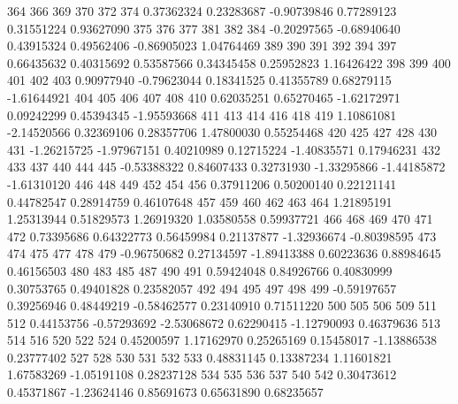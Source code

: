 \documentclass{article}
\begin{document}
\begin{Schunk}
\begin{Soutput}
        364         366         369         370         372         374 
 0.37362324  0.23283687 -0.90739846  0.77289123  0.31551224  0.93627090 
        375         376         377         381         382         384 
-0.20297565 -0.68940640  0.43915324  0.49562406 -0.86905023  1.04764469 
        389         390         391         392         394         397 
 0.66435632  0.40315692  0.53587566  0.34345458  0.25952823  1.16426422 
        398         399         400         401         402         403 
 0.90977940 -0.79623044  0.18341525  0.41355789  0.68279115 -1.61644921 
        404         405         406         407         408         410 
 0.62035251  0.65270465 -1.62172971  0.09242299  0.45394345 -1.95593668 
        411         413         414         416         418         419 
 1.10861081 -2.14520566  0.32369106  0.28357706  1.47800030  0.55254468 
        420         425         427         428         430         431 
-1.26215725 -1.97967151  0.40210989  0.12715224 -1.40835571  0.17946231 
        432         433         437         440         444         445 
-0.53388322  0.84607433  0.32731930 -1.33295866 -1.44185872 -1.61310120 
        446         448         449         452         454         456 
 0.37911206  0.50200140  0.22121141  0.44782547  0.28914759  0.46107648 
        457         459         460         462         463         464 
 1.21895191  1.25313944  0.51829573  1.26919320  1.03580558  0.59937721 
        466         468         469         470         471         472 
 0.73395686  0.64322773  0.56459984  0.21137877 -1.32936674 -0.80398595 
        473         474         475         477         478         479 
-0.96750682  0.27134597 -1.89413388  0.60223636  0.88984645  0.46156503 
        480         483         485         487         490         491 
 0.59424048  0.84926766  0.40830999  0.30753765  0.49401828  0.23582057 
        492         494         495         497         498         499 
-0.59197657  0.39256946  0.48449219 -0.58462577  0.23140910  0.71511220 
        500         505         506         509         511         512 
 0.44153756 -0.57293692 -2.53068672  0.62290415 -1.12790093  0.46379636 
        513         514         516         520         522         524 
 0.45200597  1.17162970  0.25265169  0.15458017 -1.13886538  0.23777402 
        527         528         530         531         532         533 
 0.48831145  0.13387234  1.11601821  1.67583269 -1.05191108  0.28237128 
        534         535         536         537         540         542 
 0.30473612  0.45371867 -1.23624146  0.85691673  0.65631890  0.68235657 

\end{Soutput}
\end{Schunk}
\end{document}
